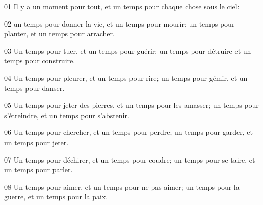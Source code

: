 01 Il y a un moment pour tout, et un temps pour chaque chose sous le ciel:

02 un temps pour donner la vie, et un temps pour mourir; un temps pour planter, et un temps pour arracher.

03 Un temps pour tuer, et un temps pour guérir; un temps pour détruire et un temps pour construire.

04 Un temps pour pleurer, et un temps pour rire; un temps pour gémir, et un temps pour danser.

05 Un temps pour jeter des pierres, et un temps pour les amasser; un temps pour s’étreindre, et un temps pour s’abstenir.

06 Un temps pour chercher, et un temps pour perdre; un temps pour garder, et un temps pour jeter.

07 Un temps pour déchirer, et un temps pour coudre; un temps pour se taire, et un temps pour parler.

08 Un temps pour aimer, et un temps pour ne pas aimer; un temps pour la guerre, et un temps pour la paix.
